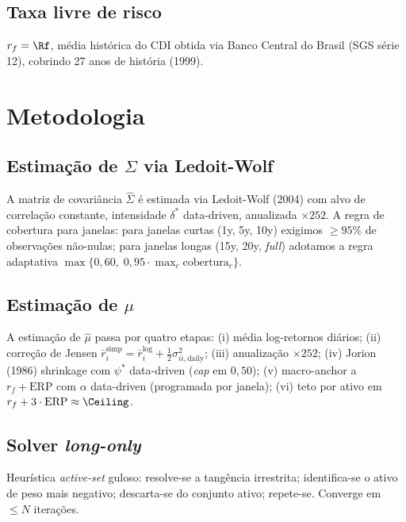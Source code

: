 \documentclass[12pt,a4paper,oneside]{article}
\begin{document}
\subsection{Taxa livre de risco}

$r_f = \Rf$, média histórica do CDI obtida via Banco Central do Brasil
(SGS série 12), cobrindo 27 anos de história (1999).

\section{Metodologia}\label{sec:metodo}

\subsection{Estimação de \texorpdfstring{$\Sigma$}{Sigma} via Ledoit-Wolf}

A matriz de covariância $\hat{\Sigma}$ é estimada via Ledoit-Wolf
(2004) com alvo de correlação constante, intensidade $\delta^*$
data-driven, anualizada $\times 252$. A regra de cobertura para
janelas: para janelas curtas (1y, 5y, 10y) exigimos $\geq 95\%$
de observações não-nulas; para janelas longas (15y, 20y, \textit{full})
adotamos a regra adaptativa $\max\{0{,}60, \; 0{,}95 \cdot \max_c
\text{cobertura}_c\}$.

\subsection{Estimação de \texorpdfstring{$\mu$}{mu}}

A estimação de $\hat{\mu}$ passa por quatro etapas: (i) média
log-retornos diários; (ii) correção de Jensen
$\bar{r}^{\text{simp}}_i = \bar{r}^{\log}_i +
\tfrac{1}{2}\sigma^2_{ii,\text{daily}}$; (iii) anualização $\times
252$; (iv) Jorion (1986) shrinkage com $\psi^*$ data-driven (\textit{cap}
em $0{,}50$); (v) macro-anchor a $r_f + \mathrm{ERP}$ com $\alpha$
data-driven (programada por janela); (vi) teto por ativo em $r_f
+ 3 \cdot \mathrm{ERP} \approx \Ceiling$.

\subsection{Solver \textit{long-only}}

Heurística \textit{active-set} guloso: resolve-se a tangência
irrestrita; identifica-se o ativo de peso mais negativo; descarta-se
do conjunto ativo; repete-se. Converge em $\leq N$ iterações.
\end{document}
